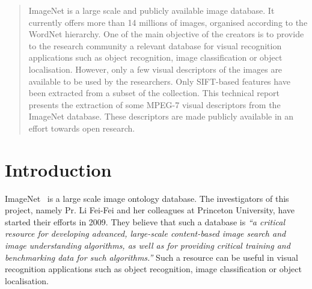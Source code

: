\documentclass[conference]{IEEEtran}
\begin{document}
\begin{abstract}
ImageNet is a large scale and publicly available image database. It currently offers more than 14 millions of images, organised according to the WordNet hierarchy. One of the main objective of the creators is to provide to the research community a relevant database for visual recognition applications such as object recognition, image classification or object localisation. However, only a few visual descriptors of the images are available to be used  by the researchers. Only SIFT-based features have been extracted from a subset of the collection. This technical report presents the extraction of some MPEG-7 visual descriptors from the ImageNet database. These descriptors are made publicly available in an effort towards open research.

\end{abstract}





%
\IEEEpeerreviewmaketitle


\section{Introduction}

ImageNet~\cite{Deng:2009} is a large scale image ontology database. The investigators of this project, namely Pr. Li Fei-Fei and her colleagues at Princeton University, have started their efforts in 2009. They believe that such a database is \textit{``a critical resource for developing advanced, large-scale content-based image search and image understanding algorithms, as well as for providing critical training and benchmarking data for such algorithms.''} Such a resource can be useful in visual recognition applications such as object recognition, image classification or object localisation.\\
\end{document}
